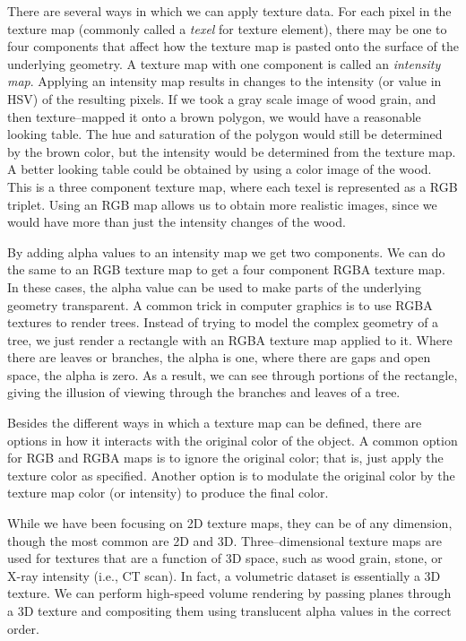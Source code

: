 There are several ways in which we can apply texture data. For each pixel in the texture map (commonly called a \emph{texel} for texture element), there may be one to four components that affect how the texture map is pasted onto the surface of the underlying geometry. A texture map with one component is called an \emph{intensity map}. Applying an intensity map results in changes to the intensity (or value in HSV) of the resulting pixels. If we took a gray scale image of wood grain, and then texture--mapped it onto a brown polygon, we would have a reasonable looking table. The hue and saturation of the polygon would still be determined by the brown color, but the intensity would be determined from the texture map. A better looking table could be obtained by using a color image of the wood. This is a three component texture map, where each texel is represented as a RGB triplet. Using an RGB map allows us to obtain more realistic images, since we would have more than just the intensity changes of the wood.

By adding alpha values to an intensity map we get two components. We can do the same to an RGB texture map to get a four component RGBA texture map. In these cases, the alpha value can be used to make parts of the underlying geometry transparent. A common trick in computer graphics is to use RGBA textures to render trees. Instead of trying to model the complex geometry of a tree, we just render a rectangle with an RGBA texture map applied to it. Where there are leaves or branches, the alpha is one, where there are gaps and open space, the alpha is zero. As a result, we can see through portions of the rectangle, giving the illusion of viewing through the branches and leaves of a tree.

Besides the different ways in which a texture map can be defined, there are options in how it interacts with the original color of the object. A common option for RGB and RGBA maps is to ignore the original color; that is, just apply the texture color as specified. Another option is to modulate the original color by the texture map color (or intensity) to produce the final color.

While we have been focusing on 2D texture maps, they can be of any dimension, though the most common are 2D and 3D. Three--dimensional texture maps are used for textures that are a function of 3D space, such as wood grain, stone, or X-ray intensity (i.e., CT scan). In fact, a volumetric dataset is essentially a 3D texture. We can perform high-speed volume rendering by passing planes through a 3D texture and compositing them using translucent alpha values in the correct order.

